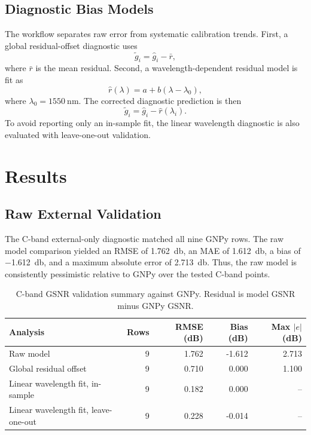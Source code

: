 \documentclass[journal]{IEEEtran}
\begin{document}
\subsection{Diagnostic Bias Models}
The workflow separates raw error from systematic calibration trends. First, a global residual-offset diagnostic uses
\begin{equation}
\tilde{g}_i = \widehat{g}_i - \bar{r},
\end{equation}
where $\bar{r}$ is the mean residual. Second, a wavelength-dependent residual model is fit as
\begin{equation}
\hat{r}(\lambda) = a + b(\lambda - \lambda_0),
\label{eq:wavelength_bias}
\end{equation}
where $\lambda_0=\SI{1550}{\nano\meter}$. The corrected diagnostic prediction is then
\begin{equation}
\tilde{g}_i = \widehat{g}_i - \hat{r}(\lambda_i).
\end{equation}
To avoid reporting only an in-sample fit, the linear wavelength diagnostic is also evaluated with leave-one-out validation.

\section{Results}
\subsection{Raw External Validation}
The C-band external-only diagnostic matched all nine GNPy rows. The raw model comparison yielded an RMSE of \SI{1.762}{\decibel}, an MAE of \SI{1.612}{\decibel}, a bias of \SI{-1.612}{\decibel}, and a maximum absolute error of \SI{2.713}{\decibel}. Thus, the raw model is consistently pessimistic relative to GNPy over the tested C-band points.

\begin{table}[!t]
\centering
\caption{C-band GSNR validation summary against GNPy. Residual is model GSNR minus GNPy GSNR.}
\label{tab:summary}
\begin{tabular}{lrrrr}
\toprule
Analysis & Rows & RMSE (dB) & Bias (dB) & Max $|e|$ (dB)\\
\midrule
Raw model & 9 & 1.762 & -1.612 & 2.713\\
Global residual offset & 9 & 0.710 & 0.000 & 1.100\\
Linear wavelength fit, in-sample & 9 & 0.182 & 0.000 & --\\
Linear wavelength fit, leave-one-out & 9 & 0.228 & -0.014 & --\\
\bottomrule
\end{tabular}
\end{table}
\end{document}
